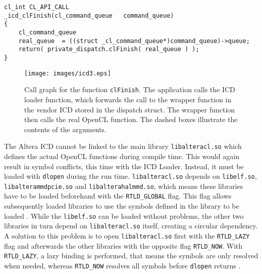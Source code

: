 \begin{lstlisting}[label=listing:clFinishIMPL, caption=Implementation of the wrapper function \texttt{\_icd\_clFinish} in the Altera ICD, morekeywords={}]
cl_int CL_API_CALL
_icd_clFinish(cl_command_queue   command_queue)
{
	cl_command_queue 
	real_queue  = ((struct _cl_command_queue*)command_queue)->queue;
	return( private_dispatch.clFinish( real_queue ) );
}
\end{lstlisting}


\begin{figure}[htb]
\centerline{
\texttt{[image: images/icd3.eps]}}
\caption{Call graph for the function \texttt{clFinish}.
The application calls the ICD loader function, which forwards the call to the wrapper function in the vendor ICD stored in the dispatch struct.
The wrapper function then calls the real OpenCL function.
The dashed boxes illustrate the contents of the arguments.}
\label{fig:icd2}
\end{figure}





The Altera ICD cannot be linked to the main library \texttt{libalteracl.so} which defines the actual OpenCL functions during compile time. This would again result in symbol conflicts, this time with the ICD Loader.
Instead, it must be loaded with \texttt{dlopen} during the run time.
\texttt{libalteracl.so} depends on \texttt{libelf.so}, \texttt{libalterammdpcie.so} and \texttt{libalterahalmmd.so}, which means these libraries have to be loaded beforehand with the \texttt{RTLD\_GLOBAL} flag.
This flag allows subsequently loaded libraries to use the symbols defined in the library to be loaded \cite{dlopen}.
While the \texttt{libelf.so} can be loaded without problems, the other two libraries in turn depend on \texttt{libalteracl.so} itself, creating a circular dependency.
A solution to this problem is to open \texttt{libalteracl.so} first with the \texttt{RTLD\_LAZY} flag and afterwards the other libraries with the opposite flag \texttt{RTLD\_NOW}.
With \texttt{RTLD\_LAZY}, a lazy binding is performed, that means the symbols are only resolved when needed, whereas \texttt{RTLD\_NOW} resolves all symbols before \texttt{dlopen} returns \cite{dlopen}.


